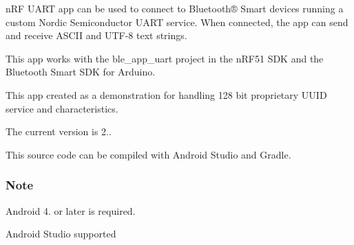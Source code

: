 n\+RF U\+A\+RT app can be used to connect to Bluetooth® Smart devices running a custom Nordic Semiconductor U\+A\+RT service. When connected, the app can send and receive A\+S\+C\+II and U\+T\+F-\/8 text strings.

This app works with the ble\+\_\+app\+\_\+uart project in the n\+R\+F51 S\+DK and the Bluetooth Smart S\+DK for Arduino.

This app created as a demonstration for handling 128 bit proprietary U\+U\+ID service and characteristics.

The current version is 2..

This source code can be compiled with Android Studio and Gradle.

\subsubsection*{Note}


\begin{DoxyItemize}
\item Android 4. or later is required.
\item Android Studio supported 
\end{DoxyItemize}